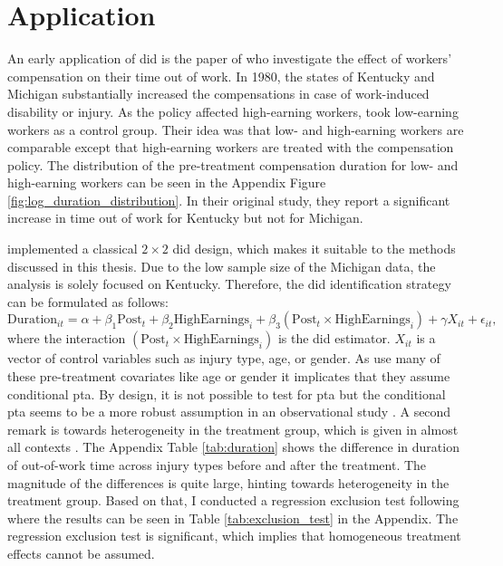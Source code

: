 \section{Application}

An early application of \ac{did} is the paper of \citet{meyer1990workers} who investigate the effect of workers' compensation on their time out of work.
In 1980, the states of Kentucky and Michigan substantially increased the compensations in case of work-induced disability or injury.
As the policy affected high-earning workers, \citet{meyer1990workers} took low-earning workers as a control group.
Their idea was that low- and high-earning workers are comparable except that high-earning workers are treated with the compensation policy.
The distribution of the pre-treatment compensation duration for low- and high-earning workers can be seen in the Appendix Figure \ref{fig:log_duration_distribution}.
In their original study, they report a significant increase in time out of work for Kentucky but not for Michigan.

\citet{meyer1990workers} implemented a classical $2 \times 2$ \ac{did} design, which makes it suitable to the methods discussed in this thesis.
Due to the low sample size of the Michigan data, the analysis is solely focused on Kentucky.
Therefore, the \ac{did} identification strategy can be formulated as follows:
\begin{equation}
\text{Duration}_{it} = \alpha + \beta_1 \text{Post}_t + \beta_2 \text{HighEarnings}_i + \beta_3 (\text{Post}_t \times \text{HighEarnings}_i) + \gamma X_{it} + \epsilon_{it},
\label{eq:duration}
\end{equation}
where the interaction $(\text{Post}_t \times \text{HighEarnings}_i)$ is the \ac{did} estimator.
$X_{it}$ is a vector of control variables such as injury type, age, or gender.
As \citet{meyer1990workers} use many of these pre-treatment covariates like age or gender it implicates that they assume conditional \ac{pta}.
By design, it is not possible to test for \ac{pta} but the conditional \ac{pta} seems to be a more robust assumption in an observational study \citep{santannaDoublyRobustDifferenceindifferences2020}.
A second remark is towards heterogeneity in the treatment group, which is given in almost all contexts \citep{DeepLearningIndividual2021}.
The Appendix Table \ref{tab:duration} shows the difference in duration of out-of-work time across injury types before and after the treatment.
The magnitude of the differences is quite large, hinting towards heterogeneity in the treatment group.
Based on that, I conducted a regression exclusion test following \citet{hansen2022econometrics} where the results can be seen in Table \ref{tab:exclusion_test} in the Appendix.
The regression exclusion test is significant, which implies that homogeneous treatment effects cannot be assumed.

